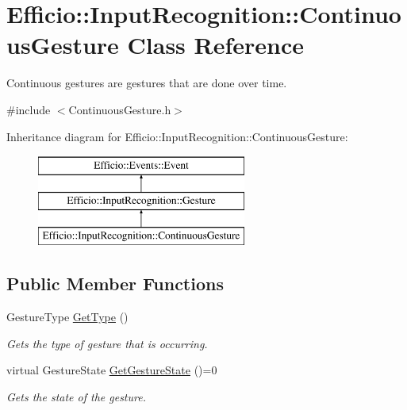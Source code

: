 \hypertarget{class_efficio_1_1_input_recognition_1_1_continuous_gesture}{}\section{Efficio\+:\+:Input\+Recognition\+:\+:Continuous\+Gesture Class Reference}
\label{class_efficio_1_1_input_recognition_1_1_continuous_gesture}


Continuous gestures are gestures that are done over time.  




{\ttfamily \#include $<$Continuous\+Gesture.\+h$>$}

Inheritance diagram for Efficio\+:\+:Input\+Recognition\+:\+:Continuous\+Gesture\+:\begin{figure}[H]
\begin{center}
\leavevmode
\includegraphics[height=3.000000cm]{class_efficio_1_1_input_recognition_1_1_continuous_gesture}
\end{center}
\end{figure}
\subsection*{Public Member Functions}
\begin{DoxyCompactItemize}
\item 
Gesture\+Type \hyperlink{class_efficio_1_1_input_recognition_1_1_continuous_gesture_aee0a3469492e3faed4dca28179645449}{Get\+Type} ()\hypertarget{class_efficio_1_1_input_recognition_1_1_continuous_gesture_aee0a3469492e3faed4dca28179645449}{}\label{class_efficio_1_1_input_recognition_1_1_continuous_gesture_aee0a3469492e3faed4dca28179645449}

\begin{DoxyCompactList}\small\item\em Gets the type of gesture that is occurring. \end{DoxyCompactList}\item 
virtual Gesture\+State \hyperlink{class_efficio_1_1_input_recognition_1_1_continuous_gesture_a29e6beed9d0f1745200412815974db7e}{Get\+Gesture\+State} ()=0\hypertarget{class_efficio_1_1_input_recognition_1_1_continuous_gesture_a29e6beed9d0f1745200412815974db7e}{}\label{class_efficio_1_1_input_recognition_1_1_continuous_gesture_a29e6beed9d0f1745200412815974db7e}

\begin{DoxyCompactList}\small\item\em Gets the state of the gesture. \end{DoxyCompactList}\end{DoxyCompactItemize}


